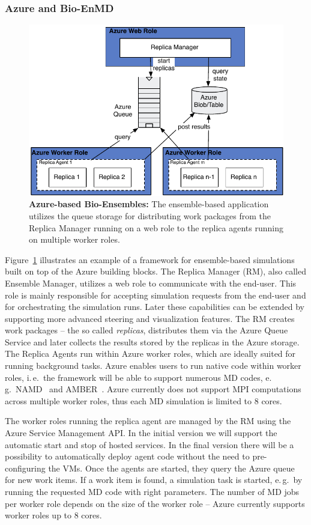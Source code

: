 \documentclass[3p,twocolumn]{elsarticle}
\begin{document}
\subsubsection{Azure and Bio-EnMD}
\begin{figure}%
   \includegraphics[width=.4\textwidth]{figures/re-azure}
    \caption{\textbf{Azure-based Bio-Ensembles:} The ensemble-based
      application utilizes the queue storage for distributing work
      packages from the Replica Manager running on a web role to the
      replica agents running on multiple worker roles.}
    \label{fig:figures_re_azure}
\end{figure}
Figure~\ref{fig:figures_re_azure} illustrates an example of a
framework for ensemble-based simulations built on top of the Azure
building blocks. The Replica Manager (RM), also called Ensemble
Manager, utilizes a web role to communicate with the end-user. This
role is mainly responsible for accepting simulation requests from the
end-user and for orchestrating the simulation runs. Later these
capabilities can be extended by supporting more advanced steering and
visualization features. The RM creates work packages -- the so called
\emph{replicas}, distributes them via the Azure Queue Service and
later collects the results stored by the replicas in the Azure
storage.  The Replica Agents run within Azure worker roles, which are
ideally suited for running background tasks. Azure enables users to
run native code within worker roles, i.\,e.\ the framework will be
able to support numerous MD codes, e.\,g.\ NAMD~\cite{Phillips:2005gd}
and AMBER~\cite{cheatham-5}.  Azure currently does not support MPI
computations across multiple worker roles, thus each MD
simulation is limited to 8 cores.

The worker roles running the replica agent are managed by the RM using
the Azure Service Management API. In the initial version we will
support the automatic start and stop of hosted services. In the final
version there will be a possibility to automatically deploy agent code
without the need to pre-configuring the VMs. Once the agents are
started, they query the Azure queue for new work items. If a work item
is found, a simulation task is started, e.\,g.\ by running the requested
MD code with right parameters.  The number of
MD jobs per worker role depends on the size of the worker role --
Azure currently supports worker roles up to 8 cores.
\end{document}
